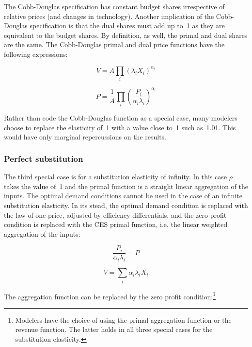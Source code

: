The Cobb-Douglas specification has constant budget shares irrespective of relative prices
(and changes in technology). Another implication of the Cobb-Douglas specification is that the
dual shares must add up to~1 as they are equivalent to the budget shares. By definition, as well,
the primal and dual shares are the same. The Cobb-Douglas primal and dual price functions have the
following expressions:

\begin{displaymath}
V=A{{\prod\limits_{i}{\left( {{\lambda }_{i}}{{X}_{i}} \right)}}^{{{\alpha }_{i}}}}
\end{displaymath}

\begin{displaymath}
P=\frac{1}{A}{{\prod\limits_{i}{\left( \frac{{{P}_{i}}}{{{\alpha }_{i}}{{\lambda
}_{i}}} \right)}}^{{{\alpha }_{i}}}}
\end{displaymath}

Rather than code the Cobb-Douglas function as a special case, many modelers choose to
replace the elasticity of~1 with a value close to~1 such as~1.01. This would have only marginal
repercussions on the results.

\subsubsection{Perfect substitution}

The third special case is for a substitution elasticity of infinity. In this case $\rho$ takes the
value of~1 and the primal function is a straight linear aggregation of the inputs. The optimal
demand conditions cannot be used in the case of an infinite substitution elasticity. In its stead,
the optimal demand condition is replaced with the law-of-one-price, adjusted by efficiency
differentials, and the zero profit condition is replaced with the CES primal function, i.e. the
linear weighted aggregation of the inputs:

\begin{displaymath}
\frac{{{P}_{i}}}{{{\alpha }_{i}}{{\lambda }_{i}}}=P
\end{displaymath}

\begin{displaymath}
V=\sum\limits_{i}{{{\alpha }_{i}}{{\lambda }_{i}}{{X}_{i}}}
\end{displaymath}

The aggregation function can be replaced by the zero profit condition:\footnote{Modelers have
the choice of using the primal aggregation function or the revenue
function. The latter holds in all three special cases for the substitution elasticity.}

